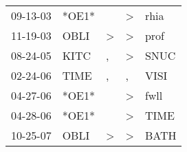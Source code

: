 \begin{supertabular}{lllll}
 09-13-03 &  *OE1* &               &  \textgreater &  rhia \\
 11-19-03 &   OBLI &  \textgreater &  \textgreater &  prof \\
 08-24-05 &   KITC &             , &  \textgreater &  SNUC \\
 02-24-06 &   TIME &             , &             , &  VISI \\
 04-27-06 &  *OE1* &               &  \textgreater &  fwll \\
 04-28-06 &  *OE1* &               &  \textgreater &  TIME \\
 10-25-07 &   OBLI &  \textgreater &  \textgreater &  BATH \\
\end{supertabular}
